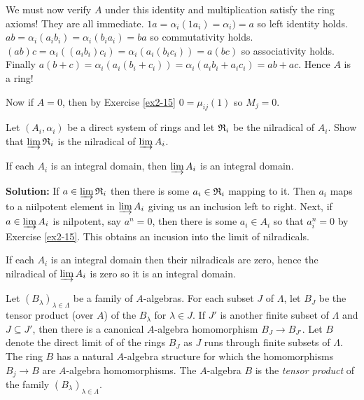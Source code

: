 \documentclass{article}
\begin{document}
We must now verify \(A\) under this identity and multiplication satisfy the ring axioms!
They are all immediate. \(1 a = \alpha_i(1 a_i) = \alpha_i) = a\) so left identity holds.
\(ab = \alpha_i(a_i b_i) = \alpha_i(b_i a_i) = ba\) so commutativity holds.
\((ab)c = \alpha_i((a_i b_i) c_i) = \alpha_i(a_i (b_i c_i)) = a(bc)\) so associativity holds.
Finally \(a(b + c) = \alpha_i(a_i (b_i + c_i)) = \alpha_i(a_i b_i + a_i c_i) = ab + ac\).
Hence \(A\) is a ring!

Now if \(A = 0\), then by Exercise \ref{ex2-15} \(0 = \mu_{ij}(1)\) so \(M_j = 0\).

\begin{exercise}
    Let \((A_i, \alpha_i)\) be a direct system of rings and let \(\mathfrak{R}_i\) be the nilradical of \(A_i\).
    Show that \(\varinjlim \mathfrak{R}_i\) is the nilradical of \(\varinjlim A_i\).

    If each \(A_i\) is an integral domain, then \(\varinjlim A_i\) is an integral domain.
\end{exercise}

\noindent\textbf{Solution:}
If \(a \in \varinjlim \mathfrak{R}_i\) then there is some \(a_i \in \mathfrak{R}_i\) mapping to it.
Then \(a_i\) maps to a niilpotent element in \(\varinjlim A_i\) giving us an inclusion left to right.
Next, if \(a \in \varinjlim A_i\) is nilpotent, say \(a^n = 0\), then there is some \(a_i \in A_i\) so that \(a_i^n = 0\) by Exercise \ref{ex2-15}.
This obtains an incusion into the limit of nilradicals.

If each \(A_i\) is an integral domain then their nilradicals are zero, hence the nilradical of \(\varinjlim A_i\) is zero so it is an integral domain.

\begin{exercise}
    Let \((B_\lambda)_{\lambda \in \Lambda}\) be a family of \(A\)-algebras.
    For each subset \(J\) of \(\Lambda\), let \(B_J\) be the tensor product (over \(A\)) of the \(B_\lambda\) for \(\lambda \in J\).
    If \(J'\) is another finite subset of \(\Lambda\) and \(J \subseteq J'\), then there is a canonical \(A\)-algebra homomorphism \(B_J \to B_{J'}\).
    Let \(B\) denote the direct limit of of the rings \(B_J\) as \(J\) runs through finite subsets of \(\Lambda\).
    The ring \(B\) has a natural \(A\)-algebra structure for which the homomorphisms \(B_j \to B\) are \(A\)-algebra homomorphisms.
    The \(A\)-algebra \(B\) is the \textit{tensor product} of the family \((B_\lambda)_{\lambda \in \Lambda}\).
\end{exercise}
\end{document}
